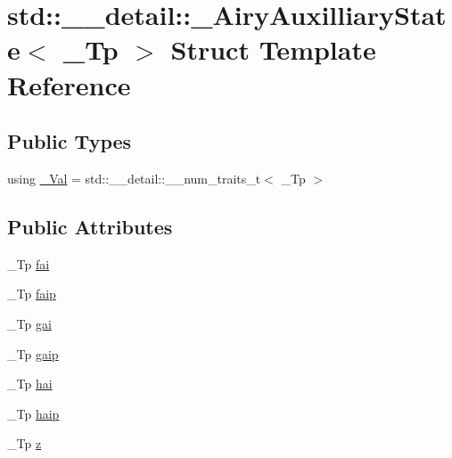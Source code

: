\hypertarget{structstd_1_1____detail_1_1__AiryAuxilliaryState}{}\section{std\+:\+:\+\_\+\+\_\+detail\+:\+:\+\_\+\+Airy\+Auxilliary\+State$<$ \+\_\+\+Tp $>$ Struct Template Reference}
\label{structstd_1_1____detail_1_1__AiryAuxilliaryState}
\subsection*{Public Types}
\begin{DoxyCompactItemize}
\item 
using \hyperlink{structstd_1_1____detail_1_1__AiryAuxilliaryState_a5f44a95a23b7c60f0b748df5f7f24f26}{\+\_\+\+Val} = std\+::\+\_\+\+\_\+detail\+::\+\_\+\+\_\+num\+\_\+traits\+\_\+t$<$ \+\_\+\+Tp $>$
\end{DoxyCompactItemize}
\subsection*{Public Attributes}
\begin{DoxyCompactItemize}
\item 
\+\_\+\+Tp \hyperlink{structstd_1_1____detail_1_1__AiryAuxilliaryState_a8724d2e0db16b03e3e7e89b54ec96c77}{fai}
\item 
\+\_\+\+Tp \hyperlink{structstd_1_1____detail_1_1__AiryAuxilliaryState_aa05bb6a248abbc7e8b1aca419fc8f3b7}{faip}
\item 
\+\_\+\+Tp \hyperlink{structstd_1_1____detail_1_1__AiryAuxilliaryState_a7e0297ccb071de8b62071733b3339291}{gai}
\item 
\+\_\+\+Tp \hyperlink{structstd_1_1____detail_1_1__AiryAuxilliaryState_a6bf0ccf2ea90395d1a035ac068a8e3d4}{gaip}
\item 
\+\_\+\+Tp \hyperlink{structstd_1_1____detail_1_1__AiryAuxilliaryState_a1fa9992d7c882e8b63f30cd4116e2d38}{hai}
\item 
\+\_\+\+Tp \hyperlink{structstd_1_1____detail_1_1__AiryAuxilliaryState_a27725093c7098e34c6d540ba3f629c56}{haip}
\item 
\+\_\+\+Tp \hyperlink{structstd_1_1____detail_1_1__AiryAuxilliaryState_a26111d17ff4b059217cbe9d5336435ce}{z}
\end{DoxyCompactItemize}


